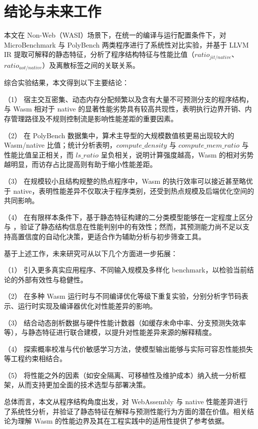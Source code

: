 \chapter{结论与未来工作}
\label{cha:conclusion}


本文在 Non-Web（WASI）场景下，在统一的编译与运行配置条件下，对 MicroBenchmark 与 PolyBench 两类程序进行了系统性对比实验，并基于 LLVM IR 提取可解释的静态特征，分析了程序结构特征与性能比值（$ratio_{jit/native}$、$ratio_{aot/native}$）及离散标签之间的关联关系。

综合实验结果，本文得到以下主要结论：

（1） 宿主交互密集、动态内存分配频繁以及含有大量不可预测分支的程序结构，与 Wasm 相对于 native 的显著性能劣势具有较高共现性，表明执行边界开销、内存管理路径及不规则控制流是影响性能差距的重要因素。

（2） 在 PolyBench 数据集中，算术主导型的大规模数值核更易出现较大的 Wasm/native 比值；统计分析表明，$compute\_density$ 与 $compute\_mem\_ratio$ 与性能比值呈正相关，而 $ls\_ratio$ 呈负相关，说明计算强度越高，Wasm 的相对劣势越明显，而访存占比提高则有助于缩小性能差距。

（3） 在规模较小且结构规整的热点程序中，Wasm 的执行效率可以接近甚至略优于 native，表明性能差异不仅取决于程序类别，还受到热点规模及后端优化空间的共同影响。

（4） 在有限样本条件下，基于静态特征构建的二分类模型能够在一定程度上区分  与 ，验证了静态结构信息在性能判别中的有效性；然而，其预测能力尚不足以支持高置信度的自动化决策，更适合作为辅助分析与初步筛查工具。

基于上述工作，未来研究可从以下几个方面进一步拓展：

（1） 引入更多真实应用程序、不同输入规模及多样化 benchmark，以检验当前结论的外部有效性与稳健性。

（2） 在多种 Wasm 运行时与不同编译优化等级下重复实验，分别分析字节码表示、运行时实现及编译器优化对性能差异的影响。

（3） 结合动态剖析数据与硬件性能计数器（如缓存未命中率、分支预测失效率等），与静态特征进行联合建模，以提升对性能差异来源的解释精度。

（4） 探索概率校准与代价敏感学习方法，使模型输出能够与实际可容忍性能损失等工程约束相结合。

（5） 将性能之外的因素（如安全隔离、可移植性及维护成本）纳入统一分析框架，从而支持更加全面的技术选型与部署决策。

总体而言，本文从程序结构角度出发，对 WebAssembly 与 native 性能差异进行了系统性分析，并验证了静态特征在解释与预测性能行为方面的潜在价值。相关结论为理解 Wasm 的性能边界及其在工程实践中的适用性提供了参考依据。

